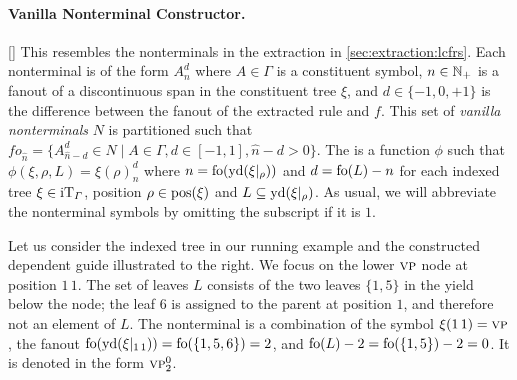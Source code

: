 \documentclass[../../document.tex]{subfiles}
\begin{document}
    \paragraph{Vanilla Nonterminal Constructor.}[]
    This resembles the nonterminals in the extraction in \cref{sec:extraction:lcfrs}.
    Each nonterminal is of the form \(A_{n}^{d}\) where \(A \in \varGamma\) is a constituent symbol, \(n \in \mathbb{N}_+\) is a fanout of a discontinuous span in the constituent tree \(\xi\), and \(d \in \{-1,0,+1\}\) is the difference between the fanout of the extracted rule and \(f\).
    This set of \emph{vanilla nonterminals} \(N\) is partitioned such that \(\mathit{fo}_{\hat{n}} = \{ A^d_{\hat{n}-d} \in N \mid A \in \varGamma, d \in [-1,1], \hat{n}-d > 0 \}\).
    The  is a function \(\phi\) such that \(\phi(\xi, \rho, L) = \xi(\rho)_{n}^{d}\) where \(n = \operatorname{fo}(\operatorname{yd}(\xi|_\rho))\) and \(d = \operatorname{fo}(L) - n\) for each indexed tree \(\xi \in \operatorname{iT}_\varGamma\), position \(\rho \in \operatorname{pos}(\xi)\) and \(L \subseteq \operatorname{yd}(\xi|_\rho)\).
    As usual, we will abbreviate the nonterminal symbols by omitting the subscript if it is \(1\).

    \begin{wrapfigure}[6]{r}{0pt}
        
    \end{wrapfigure}
    Let us consider the indexed tree in our running example and the constructed dependent guide illustrated to the right.
    We focus on the lower \(\textsc{vp}\) node at position \(1\,1\).
    The set of leaves \(L\) consists of the two leaves \(\{1,5\}\) in the yield below the node; the leaf \(6\) is assigned to the parent at position \(1\), and therefore not an element of \(L\).
    The nonterminal is a combination of the symbol \(\xi(1\,1) = \textsc{vp}\), the fanout \(\operatorname{fo}(\operatorname{yd}(\xi|_{1\,1})) = \operatorname{fo}(\{1,5,6\}) = 2\), and \(\operatorname{fo}(L) - 2 = \operatorname{fo}(\{1,5\})-2=0\).
    It is denoted in the form \(\textsc{vp}^0_2\).
    \exampleqed
\end{document}
